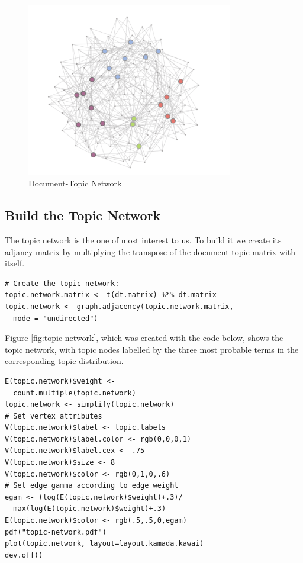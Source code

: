 \documentclass[%
	final,
	notitlepage,
	narroweqnarray,
	inline,
	]{ieee}
\begin{document}
\begin{figure}
\centering
\includegraphics[width=90mm]{dtn.pdf}
\caption{Document-Topic Network}
\label{fig:dtn}
\end{figure}


\subsection{Build the Topic Network}

\PARstart The topic network is the one of most interest to us.  To build it
we create its adjancy matrix by multiplying the transpose of the document-topic
matrix with itself.

\begin{verbatim}
# Create the topic network:
topic.network.matrix <- t(dt.matrix) %*% dt.matrix
topic.network <- graph.adjacency(topic.network.matrix, 
  mode = "undirected")
\end{verbatim}

Figure \ref{fig:topic-network}, which was created with the code below, shows the 
topic network, with 
topic nodes labelled by the three most probable terms in the corresponding
topic distribution.

\begin{verbatim}
E(topic.network)$weight <- 
  count.multiple(topic.network)
topic.network <- simplify(topic.network)
# Set vertex attributes
V(topic.network)$label <- topic.labels
V(topic.network)$label.color <- rgb(0,0,0,1)
V(topic.network)$label.cex <- .75
V(topic.network)$size <- 8
V(topic.network)$color <- rgb(0,1,0,.6)
# Set edge gamma according to edge weight
egam <- (log(E(topic.network)$weight)+.3)/
  max(log(E(topic.network)$weight)+.3)
E(topic.network)$color <- rgb(.5,.5,0,egam)
pdf("topic-network.pdf")
plot(topic.network, layout=layout.kamada.kawai)
dev.off()
\end{verbatim}
\end{document}
